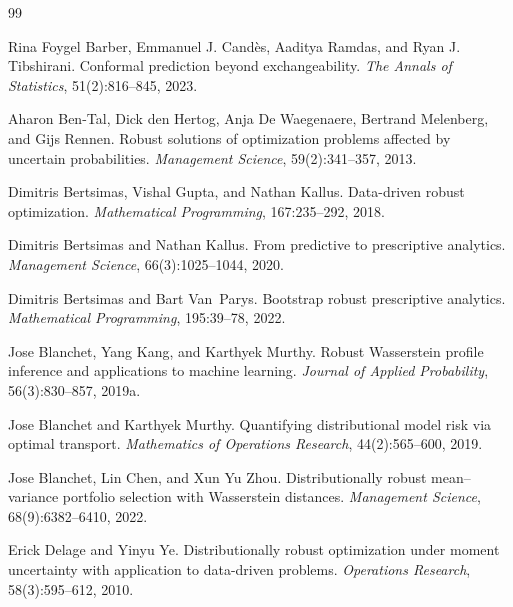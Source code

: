 \documentclass[11pt]{article}
\newcommand{\1}{\mathbf{1}}
\begin{document}
\FloatBarrier
\begingroup
\setlength{\emergencystretch}{1em}
\begin{thebibliography}{99}

Rina Foygel Barber, Emmanuel J. Cand\`es, Aaditya Ramdas, and Ryan J. Tibshirani.
\newblock Conformal prediction beyond exchangeability.
\newblock \emph{The Annals of Statistics}, 51(2):816--845, 2023.

Aharon Ben-Tal, Dick den Hertog, Anja De Waegenaere, Bertrand Melenberg, and Gijs Rennen.
\newblock Robust solutions of optimization problems affected by uncertain probabilities.
\newblock \emph{Management Science}, 59(2):341--357, 2013.

Dimitris Bertsimas, Vishal Gupta, and Nathan Kallus.
\newblock Data-driven robust optimization.
\newblock \emph{Mathematical Programming}, 167:235--292, 2018.

Dimitris Bertsimas and Nathan Kallus.
\newblock From predictive to prescriptive analytics.
\newblock \emph{Management Science}, 66(3):1025--1044, 2020.

Dimitris Bertsimas and Bart Van~Parys.
\newblock Bootstrap robust prescriptive analytics.
\newblock \emph{Mathematical Programming}, 195:39--78, 2022.

Jose Blanchet, Yang Kang, and Karthyek Murthy.
\newblock Robust Wasserstein profile inference and applications to machine learning.
\newblock \emph{Journal of Applied Probability}, 56(3):830--857, 2019a.

Jose Blanchet and Karthyek Murthy.
\newblock Quantifying distributional model risk via optimal transport.
\newblock \emph{Mathematics of Operations Research}, 44(2):565--600, 2019.

Jose Blanchet, Lin Chen, and Xun Yu Zhou.
\newblock Distributionally robust mean--variance portfolio selection with Wasserstein distances.
\newblock \emph{Management Science}, 68(9):6382--6410, 2022.

Erick Delage and Yinyu Ye.
\newblock Distributionally robust optimization under moment uncertainty with application to data-driven problems.
\newblock \emph{Operations Research}, 58(3):595--612, 2010.


\end{thebibliography}
\end{document}
